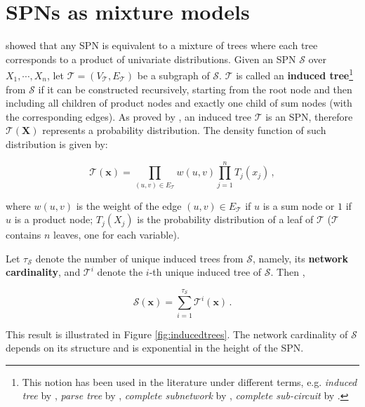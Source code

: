 \section{SPNs as mixture models}
\label{sec:spn:trees}

\citet{Zhao2015} showed that any SPN is equivalent to a mixture of trees where each tree corresponds to a product of univariate distributions. Given an SPN $\mathcal{S}$ over $X_1, \cdots, X_n$, let $\mathcal{T} = (V_\mathcal{T}, E_\mathcal{T})$ be a subgraph of $\mathcal{S}$. $\mathcal{T}$ is called an \textbf{induced tree}\footnote{This notion has been used in the literature under different terms, e.g. \emph{induced tree} by \citet{Zhao2015}, \emph{parse tree} by \citet{Mei2017}, \emph{complete subnetwork} by \citet{Desana2016}, \emph{complete sub-circuit} by \citet{Chan2006, Dennis2015}.} from $\mathcal{S}$ if it can be constructed recursively, starting from the root node and then including all children of product nodes and exactly one child of sum nodes (with the corresponding edges). As proved by \citet[Theorems 1 and 2]{Zhao2015}, an induced tree $\mathcal{T}$ is an SPN, therefore $\mathcal{T}(\mathbf{X})$ represents a probability distribution. The density function of such distribution is given by:

\begin{equation}
  \mathcal{T}(\mathbf{x}) = \prod_{(u, v) \in E_\mathcal{T}} w(u, v) \prod_{j=1}^{n} T_j(x_j) \, ,
  \label{eq:inducedtree}
\end{equation}

\noindent where $w(u, v)$ is the weight of the edge $(u, v) \in E_\mathcal{T}$ if $u$ is a sum node or $1$ if $u$ is a product node; $T_j(X_j)$ is the probability distribution of a leaf of $\mathcal{T}$ ($\mathcal{T}$ contains $n$ leaves, one for each variable).

Let $\tau_\mathcal{S}$ denote the number of unique induced trees from $\mathcal{S}$, namely, its \textbf{network cardinality}, and $\mathcal{T}^i$ denote the $i$-th unique induced tree of $\mathcal{S}$. Then \citep[Theorem 4]{Zhao2015},

\begin{equation}
  \mathcal{S}(\mathbf{x}) = \sum_{i=1}^{\tau_\mathcal{S}} \mathcal{T}^i(\mathbf{x}) \, .
  \label{eq:mixture}
\end{equation}

\noindent This result is illustrated in Figure \ref{fig:inducedtrees}. The network cardinality of $\mathcal{S}$ depends on its structure and is exponential in the height of the SPN.

